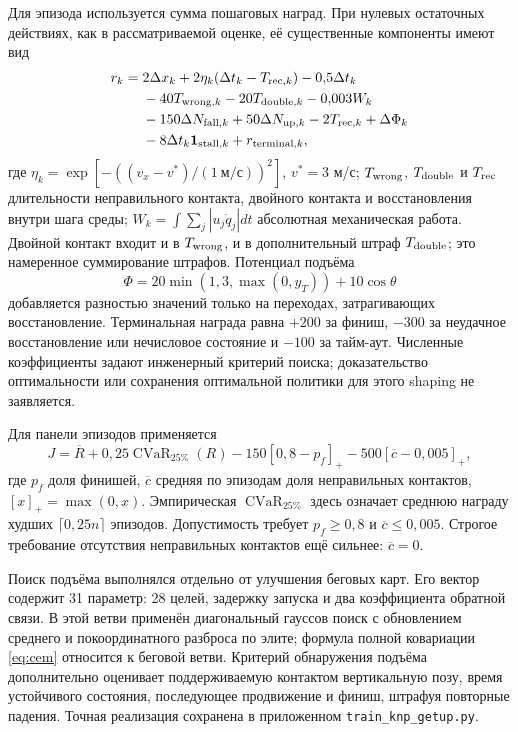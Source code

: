 \documentclass[11pt,a4paper]{article}
\newcommand{\ind}{\mathbf{1}}
\newcommand{\code}[1]{\texttt{#1}}
\begin{document}
Для эпизода используется сумма пошаговых наград. При нулевых остаточных действиях, как в рассматриваемой оценке, её существенные компоненты имеют вид
\begin{align}
 r_k={}&2\Delta x_k+2\eta_k(\Delta t_k-T_{{\rm rec},k})-0{,}5\Delta t_k\nonumber\\
      &-40T_{{\rm wrong},k}-20T_{{\rm double},k}-0{,}003W_k\nonumber\\
      &-150\Delta N_{{\rm fall},k}+50\Delta N_{{\rm up},k}
       -2T_{{\rm rec},k}+\Delta\Phi_k\nonumber\\
      &-8\Delta t_k\ind_{{\rm stall},k}+r_{{\rm terminal},k},
 \label{eq:reward}
\end{align}
где $\eta_k=\exp[-((v_x-v^*)/(1\ \text{м/с}))^2]$, $v^*=3$ м/с;
$T_{\rm wrong}$, $T_{\rm double}$ и $T_{\rm rec}$ \textemdash{} длительности неправильного контакта, двойного контакта и восстановления внутри шага среды; $W_k=\int\sum_j|u_j\dot q_j|dt$ \textemdash{} абсолютная механическая работа. Двойной контакт входит и в $T_{\rm wrong}$, и в дополнительный штраф $T_{\rm double}$; это намеренное суммирование штрафов. Потенциал подъёма
\begin{equation}
 \Phi=20\min(1{,}3,\max(0,y_T))+10\cos\theta
 \label{eq:potential}
\end{equation}
добавляется разностью значений только на переходах, затрагивающих восстановление. Терминальная награда равна $+200$ за финиш, $-300$ за неудачное восстановление или нечисловое состояние и $-100$ за тайм-аут. Численные коэффициенты задают инженерный критерий поиска; доказательство оптимальности или сохранения оптимальной политики для этого shaping не заявляется.

Для панели эпизодов применяется
\begin{equation}
 J=\overline R+0{,}25\operatorname{CVaR}_{25\%}(R)
 -150[0{,}8-p_f]_+-500[\overline c-0{,}005]_+,
 \label{eq:objective}
\end{equation}
где $p_f$ \textemdash{} доля финишей, $\overline c$ \textemdash{} средняя по эпизодам доля неправильных контактов, $[x]_+=\max(0,x)$. Эмпирическая $\operatorname{CVaR}_{25\%}$ здесь означает среднюю награду худших $\lceil0{,}25n\rceil$ эпизодов. Допустимость требует $p_f\geq0{,}8$ и $\overline c\leq0{,}005$. Строгое требование отсутствия неправильных контактов ещё сильнее: $\overline c=0$.

Поиск подъёма выполнялся отдельно от улучшения беговых карт. Его вектор содержит 31 параметр: 28 целей, задержку запуска и два коэффициента обратной связи. В этой ветви применён диагональный гауссов поиск с обновлением среднего и покоординатного разброса по элите; формула полной ковариации \eqref{eq:cem} относится к беговой ветви. Критерий обнаружения подъёма дополнительно оценивает поддерживаемую контактом вертикальную позу, время устойчивого состояния, последующее продвижение и финиш, штрафуя повторные падения. Точная реализация сохранена в приложенном \code{train\_knp\_getup.py}.
\end{document}
